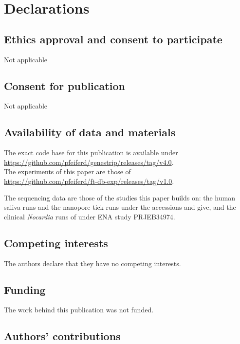 \documentclass[pdflatex,sn-vancouver-num]{sn-jnl}
\begin{document}
\section{Declarations}

\subsection{Ethics approval and consent to participate}

Not applicable

\subsection{Consent for publication}

Not applicable

\subsection{Availability of data and materials}

The exact code base for this publication is available under\\
\url{https://github.com/pfeiferd/genestrip/releases/tag/v4.0}.\\
The experiments of this paper are those of\\
\url{https://github.com/pfeiferd/ft-db-exp/releases/tag/v1.0}.

The sequencing data are those of the studies this paper builds on: the human saliva runs and the nanopore tick runs under the accessions \citet{genestrip-pub} and \citet{nanoporeticks} give, and the clinical \emph{Nocardia} runs of \citet{nocardiamngs} under ENA study PRJEB34974.

\subsection{Competing interests}

The authors declare that they have no competing interests.

\subsection{Funding}

The work behind this publication was not funded.

\subsection{Authors' contributions}
\end{document}
